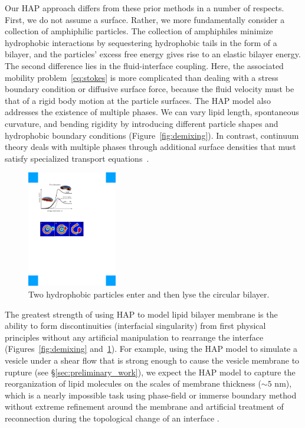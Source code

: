 Our HAP approach differs from these prior methods in a number of respects.
First, we do not assume a surface. Rather, we more fundamentally
consider a collection of amphiphilic particles.  The collection of
amphiphiles minimize hydrophobic interactions by sequestering
hydrophobic tails in the form of a bilayer, and the particles' excess
free energy gives rise to an elastic bilayer energy. The second
difference lies in the fluid-interface coupling. Here, the associated
mobility problem~\eqref{eq:stokes} is more complicated than dealing with
a stress boundary condition or diffusive surface force, because the
fluid velocity must be that of a rigid body motion at the particle
surfaces. The HAP model also addresses the existence of multiple phases.
We can vary lipid length, spontaneous curvature, and bending rigidity by
introducing different particle shapes and hydrophobic boundary
conditions (Figure~\ref{fig:demixing}). In contrast, continuum theory
deals with multiple phases through additional surface densities that
must satisfy specialized transport equations~\cite{Lowengrub07,
MikuckiZhou17}. 


\begin{figure}
\centerline{\includegraphics[width=0.35\textwidth]{figures/Lysis.pdf}}
  \vspace{-8pt}
  \caption{\label{fig:lysis} \footnotesize Two hydrophobic particles
  enter and then lyse the circular bilayer.}
\end{figure}
The greatest strength of using HAP to model lipid bilayer membrane is
the ability to form discontinuities (interfacial singularity) from first
physical principles without any artificial manipulation to rearrange the
interface (Figures~\ref{fig:demixing} and~\ref{fig:lysis}).  For
example, using the HAP model to simulate a vesicle under a shear flow
that is strong enough to cause the vesicle membrane to rupture (see
\S\ref{sec:preliminary_work}), we expect the HAP model to capture the
reorganization of lipid molecules on the scales of membrane thickness
($\sim 5$ nm), which is a nearly impossible task using phase-field or
immerse boundary method without extreme refinement around the membrane
and artificial treatment of reconnection during the topological change
of an interface \cite{doi:10.1063/5.0009734, LiAn-Chang16,
doi:10.1098/rspa.2012.0505, doi:10.1137/130941432, Feetzl18,
doi:10.1137/16M1108406}.

